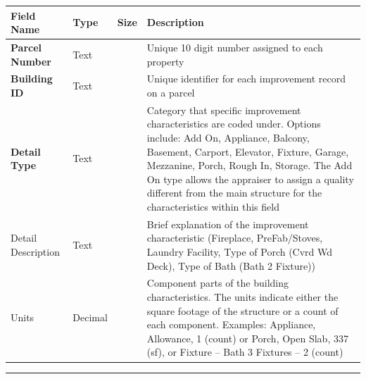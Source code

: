 \documentclass[
  english,
  letterpaper,
  DIV=11,
  numbers=noendperiod]{scrreprt}
\newcounter{none} %
\begin{document}
{\def\LTcaptype{none} %
\begin{longtable}[]{@{}
  >{\raggedright\arraybackslash}p{}
  >{\raggedright\arraybackslash}p{}
  >{\raggedright\arraybackslash}p{}
  >{\raggedright\arraybackslash}p{}@{}}
\toprule\noalign{}
\begin{minipage}[b]{\linewidth}\raggedright
Field Name
\end{minipage} & \begin{minipage}[b]{\linewidth}\raggedright
Type
\end{minipage} & \begin{minipage}[b]{\linewidth}\raggedright
Size
\end{minipage} & \begin{minipage}[b]{\linewidth}\raggedright
Description
\end{minipage} \\
\midrule\noalign{}
\endhead
\bottomrule\noalign{}
\endlastfoot
\textbf{Parcel Number} & Text & 10 & Unique 10 digit number assigned to
each property \\
\textbf{Building ID} & Text & 5 & Unique identifier for each improvement
record on a parcel \\
\textbf{Detail Type} & Text & 10 & Category that specific improvement
characteristics are coded under. Options include: Add On, Appliance,
Balcony, Basement, Carport, Elevator, Fixture, Garage, Mezzanine, Porch,
Rough In, Storage. The Add On type allows the appraiser to assign a
quality different from the main structure for the characteristics within
this field \\
Detail Description & Text & 50 & Brief explanation of the improvement
characteristic (Fireplace, PreFab/Stoves, Laundry Facility, Type of
Porch (Cvrd Wd Deck), Type of Bath (Bath 2 Fixture)) \\
Units & Decimal & 15.4 & Component parts of the building
characteristics. The units indicate either the square footage of the
structure or a count of each component. Examples: Appliance, Allowance,
1 (count) or Porch, Open Slab, 337 (sf), or Fixture -- Bath 3 Fixtures
-- 2 (count) \\
\end{longtable}
}

\begin{center}\rule{0.5\linewidth}{0.5pt}\end{center}
\end{document}
